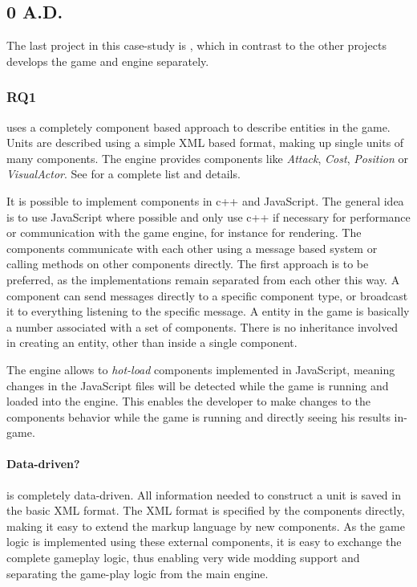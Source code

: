 \subsection{0 A.D.}
The last project in this case-study is \AD{}, which in contrast to the other projects  develops the game and engine
separately.

\subsubsection{RQ1}
\AD{} uses a completely component based approach to describe entities in the game. Units are described using a simple
XML based format, making up single units of many components. The engine provides components like \textit{Attack},
\textit{Cost}, \textit{Position} or \textit{VisualActor}. See \citet[Entity Component Documentation]{0adcomponents} for a
complete list and details. 

It is possible to implement components in c++ and JavaScript. The general idea is to use
JavaScript where possible and only use c++ if necessary for performance or communication with the game engine, for
instance for rendering. The components communicate with each other using a message based system or calling methods on
other components directly. The first approach is to be preferred, as the implementations remain separated from each other
this way. A component can send messages directly to a specific component type, or broadcast it to everything listening to
the specific message. A entity in the game is basically a number associated with a set of components. There is no
inheritance involved in creating an entity, other than inside a single component.

The engine allows to \textit{hot-load} components implemented in JavaScript, meaning changes in the JavaScript files will
be detected while the game is running and loaded into the engine. This enables the developer to make changes to the
components behavior while the game is running and directly seeing his results in-game.

\paragraph{Data-driven?}
\AD{} is completely data-driven. All information needed to construct a unit is saved in the basic XML format.
The XML format is specified by the components directly, making it easy to extend the markup language by new components.
As the game logic is implemented using these external components, it is easy to exchange the complete gameplay logic,
thus enabling very wide modding support and separating the game-play logic from the main engine.

